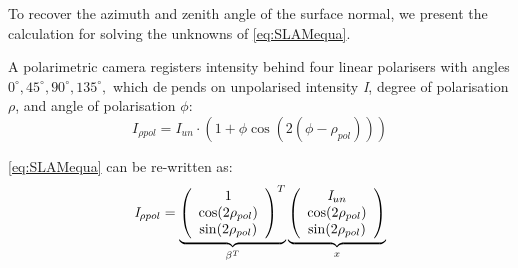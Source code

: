 \documentclass[10pt,twocolumn,letterpaper]{article}
\begin{document}
To recover the azimuth and zenith angle of the surface
normal, we present the calculation for solving the unknowns
of \cref{eq:SLAMequa}.

A polarimetric camera registers intensity behind four linear polarisers with angles $0^\circ, 45^\circ, 90^\circ, 135^\circ,$ which depends on unpolarised intensity \textit{I}, degree of polarisation $\rho$, and angle of polarisation $\phi$:
\begin{equation}
    \textit{I}_{\rho pol} = \textit{I}_{un} \cdot (1 + \phi\cos(2(\phi - \rho_{pol})))
    \label{eq:SLAMequa}
\end{equation}

\cref{eq:SLAMequa} can be re-written as:
\begin{equation}
    \textit{I}_{\rho pol} = \underbrace{\left(\begin{array}{c c c} 
                                                1\\
                                                \cos(2\rho_{pol})\\ 
                                                \sin(2\rho_{pol}) 
                                                \end{array}
                                                \right)^T}_{\beta^{T}}\underbrace{\left(\begin{array}{c c c} 
                                                \textit{I}_{un}\\
                                                \cos(2\rho_{pol})\\ 
                                                \sin(2\rho_{pol}) 
                                                \end{array}
                                                \right)}_{x}
    \label{eq:SLAMequa}
\end{equation}

{\small


}
\end{document}

